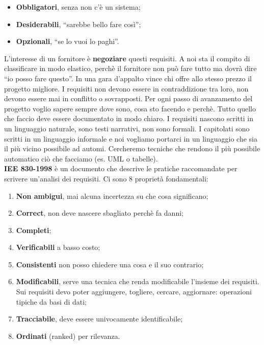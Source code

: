 \documentclass{article}
\begin{document}
\begin{itemize}

	\item \textbf{Obbligatori}, senza non c'è un sistema;
	\item \textbf{Desiderabili}, ``sarebbe bello fare così'';
	\item \textbf{Opzionali}, ``se lo vuoi lo paghi''.

\end{itemize}

L'interesse di un fornitore è \textbf{negoziare} questi requisiti. A noi sta il compito di classificare in modo elastico, perchè il fornitore non può fare tutto ma dovrà dire ``io posso fare questo''. In una gara d'appalto vince chi offre allo stesso prezzo il progetto migliore. I requisiti non devono essere in contraddizione tra loro, non devono essere mai in conflitto o sovrapposti. Per ogni passo di avanzamento del progetto voglio sapere sempre dove sono, cosa sto facendo e perchè. Tutto quello che faccio deve essere documentato in modo chiaro. I requisiti nascono scritti in un linguaggio naturale, sono testi narrativi, non sono formali. I capitolati sono scritti in un linguaggio informale e noi vogliamo portarci in un linguaggio che sia il più vicino possibile ad automi. Cercheremo tecniche che rendono il più possibile automatico ciò che facciamo (es. UML o tabelle).\\
\textbf{IEE 830-1998} è un documento che descrive le pratiche raccomandate per scrivere un'analisi dei requisiti. Ci sono 8 proprietà fondamentali:

\begin{enumerate}

	\item \textbf{Non ambigui}, mai alcuna incertezza su che cosa significano;
	\item \textbf{Correct}, non deve nascere sbagliato perchè fa danni;
	\item \textbf{Completi};
	\item \textbf{Verificabili} a basso costo;
	\item \textbf{Consistenti} non posso chiedere una cosa e il suo contrario;
	\item \textbf{Modificabili}, serve una tecnica che renda modificabile l'insieme dei requisiti. Sui requisiti devo poter aggiungere, togliere, cercare, aggiornare: operazioni tipiche da basi di dati;
	\item \textbf{Tracciabile}, deve essere univocamente identificabile;
	\item \textbf{Ordinati} (ranked) per rilevanza.

\end{enumerate}
\end{document}
